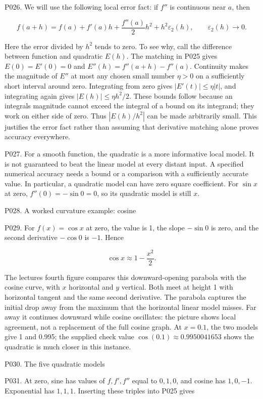 \documentclass[
  11pt,
]{article}
\providecommand{\gt}{>}
\begin{document}
P026. We will use the following local error fact: if \(f''\) is
continuous near \(a\), then

\[
f(a+h)=f(a)+f'(a)h+\frac{f''(a)}2h^2+h^2\varepsilon_2(h),\qquad \varepsilon_2(h)\to0.
\]

Here the error divided by \(h^2\) tends to zero. To see why, call the
difference between function and quadratic \(E(h)\). The matching in P025
gives \(E(0)=E'(0)=0\) and \(E''(h)=f''(a+h)-f''(a)\). Continuity makes
the magnitude of \(E''\) at most any chosen small number \(\eta\gt 0\)
on a sufficiently short interval around zero. Integrating from zero
gives \(|E'(t)|\le\eta|t|\), and integrating again gives
\(|E(h)|\le\eta h^2/2\). These bounds follow because an
integral\textquotesingle s magnitude cannot exceed the integral of a
bound on its integrand; they work on either side of zero. Thus
\(|E(h)/h^2|\) can be made arbitrarily small. This justifies the error
fact rather than assuming that derivative matching alone proves accuracy
everywhere.

P027. For a smooth function, the quadratic is a more informative local
model. It is not guaranteed to beat the linear model at every distant
input. A specified numerical accuracy needs a bound or a comparison with
a sufficiently accurate value. In particular, a quadratic model can have
zero square coefficient. For \(\sin x\) at zero, \(f''(0)=-\sin0=0\), so
its quadratic model is still \(x\).

P028. A worked curvature example: cosine

P029. For \(f(x)=\cos x\) at zero, the value is 1, the slope \(-\sin0\)
is zero, and the second derivative \(-\cos0\) is \(-1\). Hence

\[
\cos x\approx1-\frac{x^2}{2}.
\]

The lecture\textquotesingle s fourth figure compares this
downward-opening parabola with the cosine curve, with \(x\) horizontal
and \(y\) vertical. Both meet at height 1 with horizontal tangent and
the same second derivative. The parabola captures the initial drop away
from the maximum that the horizontal linear model misses. Far away it
continues downward while cosine oscillates: the picture shows local
agreement, not a replacement of the full cosine graph. At \(x=0.1\), the
two models give 1 and 0.995; the supplied check value
\(\cos(0.1)\approx0.9950041653\) shows the quadratic is much closer in
this instance.

P030. The five quadratic models

P031. At zero, sine has values of \(f,f',f''\) equal to \(0,1,0\), and
cosine has \(1,0,-1\). Exponential has \(1,1,1\). Inserting these
triples into P025 gives
\end{document}
